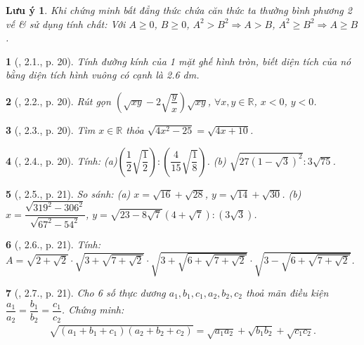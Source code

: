 \documentclass{article}
\newtheorem{baitoan}{}%
\newtheorem{luuy}{Lưu ý}
\begin{document}
\begin{luuy}
	Khi chứng minh bất đẳng thức chứa căn thức ta thường bình phương 2 vế \& sử dụng tính chất: Với $A\ge0$, $B\ge0$, $A^2 > B^2\Rightarrow A > B$, $A^2\ge B^2\Rightarrow A\ge B$.
\end{luuy}

\begin{baitoan}[\cite{Binh_boi_duong_Toan_9_tap_1}, 2.1., p. 20]
	Tính đường kính của 1 mặt ghế hình tròn, biết diện tích của nó bằng diện tích hình vuông có cạnh là {\rm2.6 dm}.
\end{baitoan}

\begin{baitoan}[\cite{Binh_boi_duong_Toan_9_tap_1}, 2.2., p. 20]
	Rút gọn $\left(\sqrt{xy} - 2\sqrt{\dfrac{y}{x}}\right)\sqrt{xy}$, $\forall x,y\in\mathbb{R}$, $x < 0$, $y < 0$.
\end{baitoan}

\begin{baitoan}[\cite{Binh_boi_duong_Toan_9_tap_1}, 2.3., p. 20]
	Tìm $x\in\mathbb{R}$ thỏa $\sqrt{4x^2 - 25} = \sqrt{4x + 10}$.
\end{baitoan}

\begin{baitoan}[\cite{Binh_boi_duong_Toan_9_tap_1}, 2.4., p. 20]
	Tính: (a)$\left(\dfrac{1}{2}\sqrt{\dfrac{1}{2}}\right):\left(\dfrac{4}{15}\sqrt{\dfrac{1}{8}}\right)$. (b) $\sqrt{27(1 - \sqrt{3})^2}:3\sqrt{75}$.
\end{baitoan}

\begin{baitoan}[\cite{Binh_boi_duong_Toan_9_tap_1}, 2.5., p. 21]
	So sánh: (a) $x = \sqrt{16} + \sqrt{28}$, $y = \sqrt{14} + \sqrt{30}$. (b) $x = \dfrac{\sqrt{319^2 - 306^2}}{\sqrt{67^2 - 54^2}}$, $y = \sqrt{23 - 8\sqrt{7}}(4 + \sqrt{7}):(3\sqrt{3})$.
\end{baitoan}

\begin{baitoan}[\cite{Binh_boi_duong_Toan_9_tap_1}, 2.6., p. 21]
	Tính: $A = \sqrt{2 + \sqrt{2}}\cdot\sqrt{3 + \sqrt{7 + \sqrt{2}}}\cdot\sqrt{3 + \sqrt{6 + \sqrt{7 + \sqrt{2}}}}\cdot\sqrt{3 - \sqrt{6 + \sqrt{7 + \sqrt{2}}}}$.
\end{baitoan}

\begin{baitoan}[\cite{Binh_boi_duong_Toan_9_tap_1}, 2.7., p. 21]
	Cho 6 số thực dương $a_1,b_1,c_1,a_2,b_2,c_2$ thoả mãn điều kiện $\dfrac{a_1}{a_2} = \dfrac{b_1}{b_2} = \dfrac{c_1}{c_2}$. Chứng minh:
	\begin{align*}
		\sqrt{(a_1 + b_1 + c_1)(a_2 + b_2 + c_2)} = \sqrt{a_1a_2} + \sqrt{b_1b_2} + \sqrt{c_1c_2}.
	\end{align*}
\end{baitoan}
\end{document}
